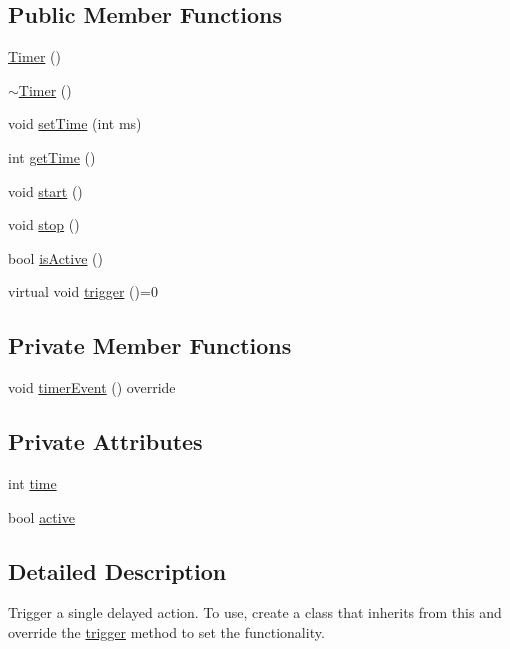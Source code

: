 \subsection*{Public Member Functions}
\begin{DoxyCompactItemize}
\item 
\hyperlink{classdrumpi_1_1clock_1_1Timer_a5f16e8da27d2a5a5242dead46de05d97}{Timer} ()
\item 
\hyperlink{classdrumpi_1_1clock_1_1Timer_a14fa469c4c295c5fa6e66a4ad1092146}{$\sim$\+Timer} ()
\item 
void \hyperlink{classdrumpi_1_1clock_1_1Timer_a0a079d37a70001bfd23754d091db555d}{set\+Time} (int ms)
\item 
int \hyperlink{classdrumpi_1_1clock_1_1Timer_a5f9d0c70ff7666713743f5ee2180b9b4}{get\+Time} ()
\item 
void \hyperlink{classdrumpi_1_1clock_1_1Timer_a3a8b5272198d029779dc9302a54305a8}{start} ()
\item 
void \hyperlink{classdrumpi_1_1clock_1_1Timer_a63f0eb44b27402196590a03781515dba}{stop} ()
\item 
bool \hyperlink{classdrumpi_1_1clock_1_1Timer_ae675038252bdd55e0d42a92535025ee1}{is\+Active} ()
\item 
virtual void \hyperlink{classdrumpi_1_1clock_1_1Timer_aeed4c4e653b98280354e0b970f8df68b}{trigger} ()=0
\end{DoxyCompactItemize}
\subsection*{Private Member Functions}
\begin{DoxyCompactItemize}
\item 
void \hyperlink{classdrumpi_1_1clock_1_1Timer_ab7328c35aba7b6887eea4bb6f90c5659}{timer\+Event} () override
\end{DoxyCompactItemize}
\subsection*{Private Attributes}
\begin{DoxyCompactItemize}
\item 
int \hyperlink{classdrumpi_1_1clock_1_1Timer_a34ceb43c3f8fa2fd42f73aefb133497b}{time}
\item 
bool \hyperlink{classdrumpi_1_1clock_1_1Timer_a6a750b89a375a5f73f2d28ac951c0d24}{active}
\end{DoxyCompactItemize}


\subsection{Detailed Description}
Trigger a single delayed action. To use, create a class that inherits from this and override the \hyperlink{classdrumpi_1_1clock_1_1Timer_aeed4c4e653b98280354e0b970f8df68b}{trigger} method to set the functionality. 

